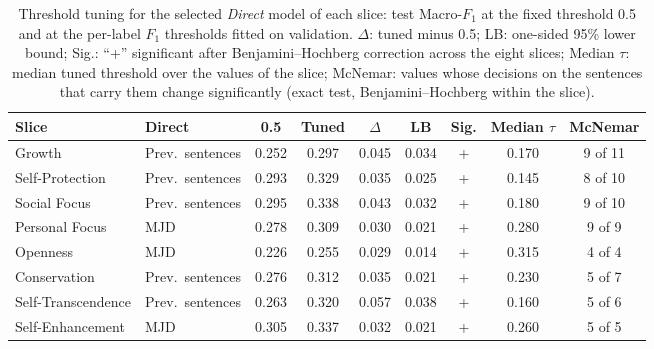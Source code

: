\begin{table}[!htbp]
\centering
\footnotesize
\caption{Threshold tuning for the selected \emph{Direct} model of each slice: test Macro-$F_1$ at the fixed threshold 0.5 and at the per-label $F_1$ thresholds fitted on validation. $\Delta$: tuned minus 0.5; LB: one-sided 95\% lower bound; Sig.: ``+'' significant after Benjamini--Hochberg correction across the eight slices; Median $\tau$: median tuned threshold over the values of the slice; McNemar: values whose decisions on the sentences that carry them change significantly (exact test, Benjamini--Hochberg within the slice).}
\label{tab:s8-thr-direct}
\begin{tabularx}{\textwidth}{lXccccccc}
\hline
\textbf{Slice} & \textbf{Direct} & \textbf{0.5} & \textbf{Tuned} & \textbf{$\Delta$} & \textbf{LB} & \textbf{Sig.} & \textbf{Median $\tau$} & \textbf{McNemar} \\
\hline
Growth & Prev.\ sentences & 0.252 & 0.297 & 0.045 & 0.034 & + & 0.170 & 9 of 11 \\
Self-Protection & Prev.\ sentences & 0.293 & 0.329 & 0.035 & 0.025 & + & 0.145 & 8 of 10 \\
Social Focus & Prev.\ sentences & 0.295 & 0.338 & 0.043 & 0.032 & + & 0.180 & 9 of 10 \\
Personal Focus & MJD & 0.278 & 0.309 & 0.030 & 0.021 & + & 0.280 & 9 of 9 \\
Openness & MJD & 0.226 & 0.255 & 0.029 & 0.014 & + & 0.315 & 4 of 4 \\
Conservation & Prev.\ sentences & 0.276 & 0.312 & 0.035 & 0.021 & + & 0.230 & 5 of 7 \\
Self-Transcendence & Prev.\ sentences & 0.263 & 0.320 & 0.057 & 0.038 & + & 0.160 & 5 of 6 \\
Self-Enhancement & MJD & 0.305 & 0.337 & 0.032 & 0.021 & + & 0.260 & 5 of 5 \\
\hline
\end{tabularx}
\end{table}

